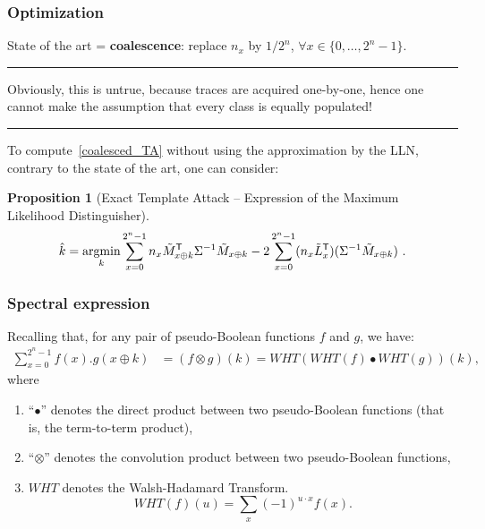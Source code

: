 \documentclass{beamer}
\newtheorem{proposition}{Proposition}
\DeclareMathOperator*\argmin{argmin}
\begin{document}
\begin{frame}

\frametitle{Optimization}

\color{blue}
State of the art = \textbf{coalescence}:
replace
$n_x$ by $1/2^n$, $\forall x\in\{0, \ldots, 2^n-1\}$.

\medskip
\hrule
\medskip

Obviously, this is untrue, because traces are acquired one-by-one, hence one cannot make the assumption that every class is equally populated!

\medskip
\hrule
\medskip
\color{black}

To compute~\eqref{coalesced_TA} without using the approximation by the LLN, contrary to the state of the art, one can consider:


\begin{proposition}[Exact Template Attack -- Expression of the Maximum Likelihood Distinguisher]
\label{Exact_Template_Attack}
$$\Hat{k} = \argmin_k \space \sum_{x=0}^{2^n-1} n_x \Tilde{M}^\mathsf{T}_{x \oplus k} \Sigma^{-1}  \Tilde{M}_{x \oplus k} - 2\sum_{x=0}^{2^n-1}(n_x \Tilde{L}^\mathsf{T}_x)(\Sigma^{-1}\Tilde{M}_{x\oplus k}) \ .$$
\end{proposition}

\end{frame}


\begin{frame}

\frametitle{Spectral expression}


Recalling that, for any pair of pseudo-Boolean functions $f$ and $g$, we have: 
\begin{align*}
\sum_{x=0}^{2^n-1}f(x).g(x \oplus k)&=(f \otimes g)(k)%
=WHT(WHT(f) \bullet WHT(g))(k) ,
\end{align*}
where 
\begin{enumerate}
    \item ``$\bullet$'' denotes the direct product between two pseudo-Boolean functions (that is, the term-to-term product),
    \item ``$\otimes$'' denotes the convolution product between two pseudo-Boolean functions,
    \item $WHT$ denotes the Walsh-Hadamard Transform. %
$$WHT(f)(u) = \sum_x (-1)^{u \cdot x} f(x).$$
\end{enumerate}
\end{frame}
\end{document}
